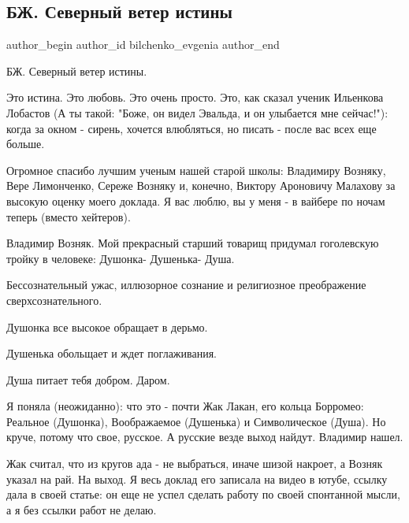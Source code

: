  
 
 
 
 
 
\subsection{БЖ. Северный ветер истины}
\label{sec:15_06_2021.fb.bilchenko_evgenia.1.severnyj_veter_istiny}
\ifcmt
 author_begin
   author_id bilchenko_evgenia
 author_end
\fi

БЖ. Северный ветер истины.

Это истина. Это любовь. Это очень просто. Это, как сказал ученик Ильенкова
Лобастов (А ты такой: "Боже, он видел Эвальда, и он улыбается мне сейчас!"):
когда за окном - сирень, хочется влюбляться, но писать - после вас всех еще
больше. 

Огромное спасибо лучшим ученым нашей старой школы: Владимиру Возняку, Вере
Лимонченко, Сереже Возняку и, конечно, Виктору Ароновичу Малахову за высокую
оценку моего доклада. Я вас люблю, вы у меня - в вайбере по ночам теперь
(вместо хейтеров). 

Владимир Возняк. Мой прекрасный старший товарищ придумал гоголевскую тройку в человеке: Душонка- Душенька- Душа. 

Бессознательный ужас, иллюзорное сознание и религиозное преображение сверхсознательного. 

Душонка все высокое обращает в дерьмо. 

Душенька обольщает и ждет поглаживания. 

Душа питает тебя добром. Даром. 

Я поняла (неожиданно): что это - почти Жак Лакан, его кольца Борромео: Реальное
(Душонка), Воображаемое (Душенька) и Символическое (Душа). Но круче, потому что
свое, русское. А русские везде выход найдут. Владимир нашел. 

Жак считал, что из кругов ада - не выбраться, иначе шизой накроет, а Возняк
указал на рай. На выход. Я весь доклад его записала на видео в ютубе, ссылку
дала в своей статье: он еще не успел сделать работу по своей спонтанной мысли,
а я без ссылки работ не делаю. 

